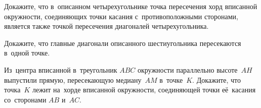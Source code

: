 \item
Докажите, что в~описанном четырехугольнике точка пересечения хорд вписанной
окружности, соединяющих точки касания с~противоположными сторонами, является
также точкой пересечения диагоналей четырехугольника.

\item
Докажите, что главные диагонали описанного шестиугольника пересекаются в~одной
точке.

\item
Из~центра вписанной в~треугольник $ABC$ окружности параллельно высоте~$AH$
выпустили прямую, пересекающую медиану~$AM$ в~точке~$K$.
Докажите, что точка~$K$ лежит на~хорде вписанной окружности, соединяющей точки
её~касания со~сторонами $AB$ и~$AC$.

\fi %

